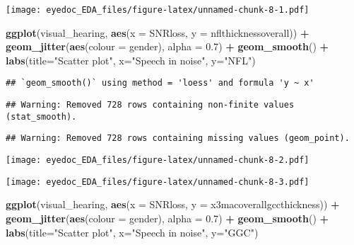 \documentclass[]{article}
\newenvironment{Shaded}{\begin{snugshade}}{\end{snugshade}}
\newcommand{\DataTypeTok}[1]{\textcolor[rgb]{0.13,0.29,0.53}{#1}}
\newcommand{\FloatTok}[1]{\textcolor[rgb]{0.00,0.00,0.81}{#1}}
\newcommand{\KeywordTok}[1]{\textcolor[rgb]{0.13,0.29,0.53}{\textbf{#1}}}
\newcommand{\NormalTok}[1]{#1}
\newcommand{\OperatorTok}[1]{\textcolor[rgb]{0.81,0.36,0.00}{\textbf{#1}}}
\newcommand{\StringTok}[1]{\textcolor[rgb]{0.31,0.60,0.02}{#1}}
\begin{document}
\texttt{[image: eyedoc\_EDA\_files/figure-latex/unnamed-chunk-8-1.pdf]}

\begin{Shaded}
\begin{Highlighting}[]
\KeywordTok{ggplot}\NormalTok{(visual_hearing, }\KeywordTok{aes}\NormalTok{(}\DataTypeTok{x =}\NormalTok{ SNRloss, }\DataTypeTok{y =}\NormalTok{ nflthicknessoverall)) }\OperatorTok{+}
\StringTok{    }\KeywordTok{geom_jitter}\NormalTok{(}\KeywordTok{aes}\NormalTok{(}\DataTypeTok{colour =}\NormalTok{ gender), }\DataTypeTok{alpha =} \FloatTok{0.7}\NormalTok{) }\OperatorTok{+}
\StringTok{    }\KeywordTok{geom_smooth}\NormalTok{() }\OperatorTok{+}
\StringTok{    }\KeywordTok{labs}\NormalTok{(}\DataTypeTok{title=}\StringTok{"Scatter plot"}\NormalTok{, }\DataTypeTok{x=}\StringTok{"Speech in noise"}\NormalTok{, }\DataTypeTok{y=}\StringTok{"NFL"}\NormalTok{)}
\end{Highlighting}
\end{Shaded}

\begin{verbatim}
## `geom_smooth()` using method = 'loess' and formula 'y ~ x'
\end{verbatim}

\begin{verbatim}
## Warning: Removed 728 rows containing non-finite values (stat_smooth).
\end{verbatim}

\begin{verbatim}
## Warning: Removed 728 rows containing missing values (geom_point).
\end{verbatim}

\texttt{[image: eyedoc\_EDA\_files/figure-latex/unnamed-chunk-8-2.pdf]}

\begin{Shaded}
\end{Shaded}

\texttt{[image: eyedoc\_EDA\_files/figure-latex/unnamed-chunk-8-3.pdf]}

\begin{Shaded}
\begin{Highlighting}[]
\KeywordTok{ggplot}\NormalTok{(visual_hearing, }\KeywordTok{aes}\NormalTok{(}\DataTypeTok{x =}\NormalTok{ SNRloss, }\DataTypeTok{y =}\NormalTok{ x3macoverallgccthickness)) }\OperatorTok{+}
\StringTok{    }\KeywordTok{geom_jitter}\NormalTok{(}\KeywordTok{aes}\NormalTok{(}\DataTypeTok{colour =}\NormalTok{ gender), }\DataTypeTok{alpha =} \FloatTok{0.7}\NormalTok{) }\OperatorTok{+}
\StringTok{    }\KeywordTok{geom_smooth}\NormalTok{() }\OperatorTok{+}
\StringTok{    }\KeywordTok{labs}\NormalTok{(}\DataTypeTok{title=}\StringTok{"Scatter plot"}\NormalTok{, }\DataTypeTok{x=}\StringTok{"Speech in noise"}\NormalTok{, }\DataTypeTok{y=}\StringTok{"GGC"}\NormalTok{)}
\end{Highlighting}
\end{Shaded}
\end{document}
